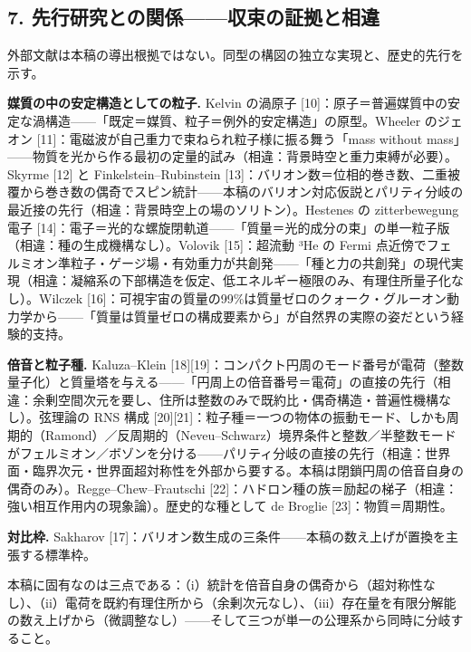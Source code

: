 \documentclass[
  a4paper,
]{ltjsarticle}
\begin{document}
\subsection{7.
先行研究との関係------収束の証拠と相違}\label{ux5148ux884cux7814ux7a76ux3068ux306eux95a2ux4fc2ux53ceux675fux306eux8a3cux62e0ux3068ux76f8ux9055}

外部文献は本稿の導出根拠ではない。同型の構図の独立な実現と、歴史的先行を示す。

\textbf{媒質の中の安定構造としての粒子.} Kelvin の渦原子
{[}10{]}：原子＝普遍媒質中の安定な渦構造------「既定＝媒質、粒子＝例外的安定構造」の原型。Wheeler
のジェオン {[}11{]}：電磁波が自己重力で束ねられ粒子様に振る舞う「mass
without
mass」------物質を光から作る最初の定量的試み（相違：背景時空と重力束縛が必要）。Skyrme
{[}12{]} と Finkelstein--Rubinstein
{[}13{]}：バリオン数＝位相的巻き数、二重被覆から巻き数の偶奇でスピン統計------本稿のバリオン対応仮説とパリティ分岐の最近接の先行（相違：背景時空上の場のソリトン）。Hestenes
の zitterbewegung 電子
{[}14{]}：電子＝光的な螺旋閉軌道------「質量＝光的成分の束」の単一粒子版（相違：種の生成機構なし）。Volovik
{[}15{]}：超流動 ³He の Fermi
点近傍でフェルミオン準粒子・ゲージ場・有効重力が共創発------「種と力の共創発」の現代実現（相違：凝縮系の下部構造を仮定、低エネルギー極限のみ、有理住所量子化なし）。Wilczek
{[}16{]}：可視宇宙の質量の99\%は質量ゼロのクォーク・グルーオン動力学から------「質量は質量ゼロの構成要素から」が自然界の実際の姿だという経験的支持。

\textbf{倍音と粒子種.} Kaluza--Klein
{[}18{]}{[}19{]}：コンパクト円周のモード番号が電荷（整数量子化）と質量塔を与える------「円周上の倍音番号＝電荷」の直接の先行（相違：余剰空間次元を要し、住所は整数のみで既約比・偶奇構造・普遍性機構なし）。弦理論の
RNS 構成
{[}20{]}{[}21{]}：粒子種＝一つの物体の振動モード、しかも周期的（Ramond）／反周期的（Neveu--Schwarz）境界条件と整数／半整数モードがフェルミオン／ボゾンを分ける------パリティ分岐の直接の先行（相違：世界面・臨界次元・世界面超対称性を外部から要する。本稿は閉鎖円周の倍音自身の偶奇のみ）。Regge--Chew--Frautschi
{[}22{]}：ハドロン種の族＝励起の梯子（相違：強い相互作用内の現象論）。歴史的な種として
de Broglie {[}23{]}：物質＝周期性。

\textbf{対比枠.} Sakharov
{[}17{]}：バリオン数生成の三条件------本稿の数え上げが置換を主張する標準枠。

本稿に固有なのは三点である：（i）統計を倍音自身の偶奇から（超対称性なし）、（ii）電荷を既約有理住所から（余剰次元なし）、（iii）存在量を有限分解能の数え上げから（微調整なし）------そして三つが単一の公理系から同時に分岐すること。
\end{document}
